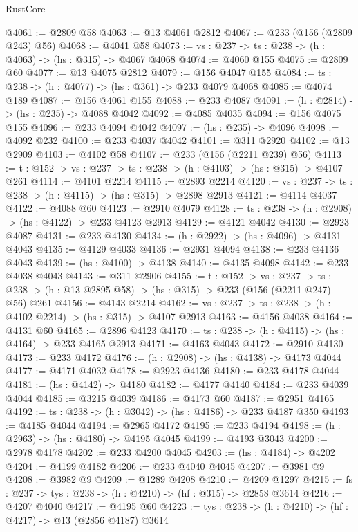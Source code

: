 \begin{lexlean}{RustCore}
\begin{coremodule}
@4061 := @2809 @58
@4063 := @13 @4061 @2812
@4067 := @233 (@156 (@2809 @243) @56)
@4068 := @4041 @58
@4073 := {vs : @237} -> {ts : @238} -> (h : @4063) -> (hs : @315) -> @4067 @4068
@4074 := @4060 @155
@4075 := @2809 @60
@4077 := @13 @4075 @2812
@4079 := @156 @4047 @155
@4084 := {ts : @238} -> (h : @4077) -> (hs : @361) -> @233 @4079 @4068
@4085 := @4074 @189
@4087 := @156 @4061 @155
@4088 := @233 @4087
@4091 := (h : @2814) -> (hs : @235) -> @4088 @4042
@4092 := @4085 @4035
@4094 := @156 @4075 @155
@4096 := @233 @4094 @4042
@4097 := (hs : @235) -> @4096
@4098 := @4092 @232
@4100 := @233 @4037 @4042
@4101 := @311 @2920
@4102 := @13 @2909
@4103 := @4102 @58
@4107 := @233 (@156 (@2211 @239) @56)
@4113 := {t : @152} -> {vs : @237} -> {ts : @238} -> (h : @4103) -> (hs : @315) -> @4107 @261
@4114 := @4101 @2214
@4115 := @2893 @2214
@4120 := {vs : @237} -> {ts : @238} -> (h : @4115) -> (hs : @315) -> @2898 @2913
@4121 := @4114 @4037
@4122 := @4088 @60
@4123 := @2910 @4079
@4128 := {ts : @238} -> (h : @2908) -> (hs : @4122) -> @233 @4123 @2913
@4129 := @4121 @4042
@4130 := @2923 @4087
@4131 := @233 @4130
@4134 := (h : @2922) -> (hs : @4096) -> @4131 @4043
@4135 := @4129 @4033
@4136 := @2931 @4094
@4138 := @233 @4136 @4043
@4139 := (hs : @4100) -> @4138
@4140 := @4135 @4098
@4142 := @233 @4038 @4043
@4143 := @311 @2906
@4155 := {t : @152} ->
  {vs : @237} ->
  {ts : @238} -> (h : @13 @2895 @58) -> (hs : @315) -> @233 (@156 (@2211 @247) @56) @261
@4156 := @4143 @2214
@4162 := {vs : @237} -> {ts : @238} -> (h : @4102 @2214) -> (hs : @315) -> @4107 @2913
@4163 := @4156 @4038
@4164 := @4131 @60
@4165 := @2896 @4123
@4170 := {ts : @238} -> (h : @4115) -> (hs : @4164) -> @233 @4165 @2913
@4171 := @4163 @4043
@4172 := @2910 @4130
@4173 := @233 @4172
@4176 := (h : @2908) -> (hs : @4138) -> @4173 @4044
@4177 := @4171 @4032
@4178 := @2923 @4136
@4180 := @233 @4178 @4044
@4181 := (hs : @4142) -> @4180
@4182 := @4177 @4140
@4184 := @233 @4039 @4044
@4185 := @3215 @4039
@4186 := @4173 @60
@4187 := @2951 @4165
@4192 := {ts : @238} -> (h : @3042) -> (hs : @4186) -> @233 @4187 @350
@4193 := @4185 @4044
@4194 := @2965 @4172
@4195 := @233 @4194
@4198 := (h : @2963) -> (hs : @4180) -> @4195 @4045
@4199 := @4193 @3043
@4200 := @2978 @4178
@4202 := @233 @4200 @4045
@4203 := (hs : @4184) -> @4202
@4204 := @4199 @4182
@4206 := @233 @4040 @4045
@4207 := @3981 @9
@4208 := @3982 @9
@4209 := @1289 @4208
@4210 := @4209 @1297
@4215 := {fs : @237} -> {tys : @238} -> (h : @4210) -> (hf : @315) -> @2858 @3614
@4216 := @4207 @4040
@4217 := @4195 @60
@4223 := {tys : @238} -> (h : @4210) -> (hf : @4217) -> @13 (@2856 @4187) @3614

\end{coremodule}
\end{lexlean}
